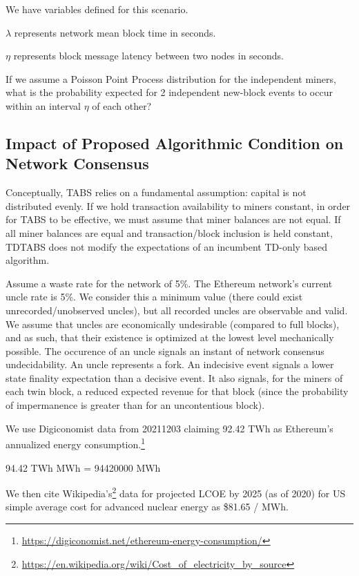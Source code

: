 \documentclass[11pt]{article}
\theoremstyle{plain}
\begin{document}
{We have variables defined for this scenario.

$\lambda$ represents network mean block time in seconds.

$\eta$ represents block message latency between two nodes in seconds.

If we assume a Poisson Point Process distribution for the independent miners,
what is the probability expected for 2 independent new-block events to occur
within an interval $\eta$ of each other?


\subsection{\normalsize{Impact of Proposed Algorithmic Condition on Network
Consensus}}

Conceptually, TABS relies on a fundamental assumption: capital is not
distributed evenly.
If we hold transaction availability to miners constant, in order for TABS to be
effective, we must assume that miner balances are not equal.
If all miner balances are equal and transaction/block inclusion is held
constant, TDTABS does not modify the expectations of an incumbent TD-only based
algorithm.

Assume a waste rate for the network of 5\%.
The Ethereum network's current uncle rate is 5\%. We consider this a minimum
value (there could exist unrecorded/unobserved uncles), but all recorded uncles
are observable and valid.
We assume that uncles are economically undesirable (compared to full blocks),
and as such, that their existence is optimized at the lowest level mechanically
possible.
The occurence of an uncle signals an instant of network consensus
undecidability.
An uncle represents a fork.
An indecisive event signals a lower state finality expectation than a decisive
event.
It also signals, for the miners of each twin block, a reduced expected revenue
for that block (since the probability of impermanence is greater than for an
uncontentious block).

We use Digiconomist data from 20211203 claiming 92.42 TWh as Ethereum's
annualized energy
consumption.\footnote{\url{https://digiconomist.net/ethereum-energy-consumption/}}

94.42 TWh \rightarrow MWh = 94420000 MWh

We then cite
Wikipedia's\footnote{\url{https://en.wikipedia.org/wiki/Cost_of_electricity_by_source}} data for projected LCOE by 2025 (as of 2020) for US simple average cost for
advanced nuclear energy as \$81.65 / MWh.

}
\end{document}
